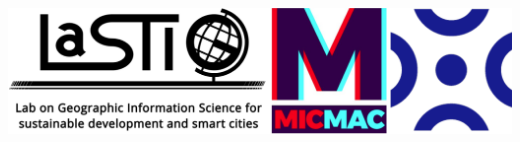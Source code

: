 

\begin{titlepage}
\begin{center}
\begin{minipage}[t]{1\linewidth}
	\centering
	\includegraphics[width=15cm]{images/TitlePage/logo.png}
\end{minipage}%


\end{center}
\end{titlepage}
